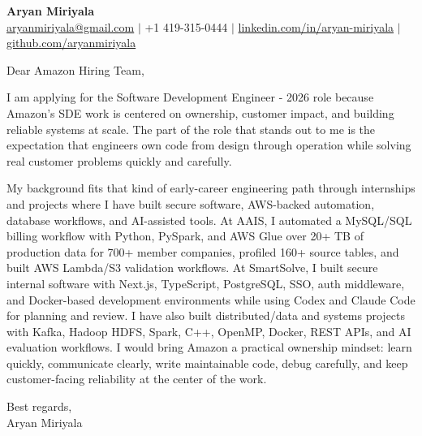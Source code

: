 \documentclass[11pt]{letter}
\begin{document}
\begin{center}
{\Large \textbf{Aryan Miriyala}}\\
\href{mailto:aryanmiriyala@gmail.com}{aryanmiriyala@gmail.com} $|$ +1 419-315-0444 $|$
\href{https://www.linkedin.com/in/aryan-miriyala-7788a21b6/}{linkedin.com/in/aryan-miriyala} $|$
\href{https://github.com/aryanmiriyala}{github.com/aryanmiriyala}
\end{center}

\vspace{0.25in}

Dear Amazon Hiring Team,

I am applying for the Software Development Engineer - 2026 role because Amazon's SDE work is centered on ownership, customer impact, and building reliable systems at scale. The part of the role that stands out to me is the expectation that engineers own code from design through operation while solving real customer problems quickly and carefully.

My background fits that kind of early-career engineering path through internships and projects where I have built secure software, AWS-backed automation, database workflows, and AI-assisted tools. At AAIS, I automated a MySQL/SQL billing workflow with Python, PySpark, and AWS Glue over 20+ TB of production data for 700+ member companies, profiled 160+ source tables, and built AWS Lambda/S3 validation workflows. At SmartSolve, I built secure internal software with Next.js, TypeScript, PostgreSQL, SSO, auth middleware, and Docker-based development environments while using Codex and Claude Code for planning and review. I have also built distributed/data and systems projects with Kafka, Hadoop HDFS, Spark, C++, OpenMP, Docker, REST APIs, and AI evaluation workflows. I would bring Amazon a practical ownership mindset: learn quickly, communicate clearly, write maintainable code, debug carefully, and keep customer-facing reliability at the center of the work.

\vspace{0.15in}

Best regards,\\
Aryan Miriyala
\end{document}
